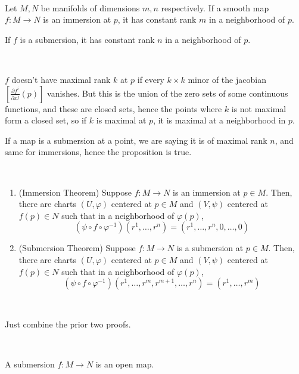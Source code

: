 \documentclass{article}
\begin{document}
\begin{proposition}
  \

  Let $M, N$ be manifolds of dimensions $m, n$ respectively. If a smooth map $f: M \to N$ is an immersion at $p$, it has constant rank $m$ in a neighborhood of $p$.

  If $f$ is a submersion, it has constant rank $n$ in a neighborhood of $p$.
\end{proposition}

\begin{customproof}
  \

  $f$ doesn't have maximal rank $k$ at $p$ if every $k \times k$ minor of the jacobian $[\frac{\partial f^i}{\partial x^j}(p)]$ vanishes. But this is the union of the zero sets of some continuous functions, and these are closed sets, hence the points where $k$ is not maximal form a closed set, so if $k$ is maximal at $p$, it is maximal at a neighborhood in $p$.

  If a map is a submersion at a point, we are saying it is of maximal rank $n$, and same for immersions, hence the proposition is true.
\end{customproof}

\begin{theorem}
  \

  \begin{enumerate}
    \item (Immersion Theorem) Suppose $f: M \to N$ is an immersion at $p \in M$. Then, there are charts $(U, \varphi)$ centered at $p \in M$ and $(V,\psi)$ centered at $f(p) \in N$ such that in a neighborhood of $\varphi(p)$, $$(\psi \circ f \circ \varphi ^{-1})(r^1, \dots, r^n) = (r^1, \dots, r^n, 0, \dots, 0)$$
    \item (Submersion Theorem) Suppose $f: M \to N$ is a submersion at $p \in M$. Then, there are charts $(U, \varphi)$ centered at $p \in M$ and $(V,\psi)$ centered at $f(p) \in N$ such that in a neighborhood of $\varphi(p)$, $$(\psi \circ f \circ \varphi ^{-1})(r^1, \dots, r^m, r^{m+1}, \dots, r^n) = (r^1, \dots, r^m)$$
  \end{enumerate}
\end{theorem}

\begin{customproof}
  \

  Just combine the prior two proofs.
\end{customproof}

\begin{corollary}
  \

  A submersion $f: M \to N$ is an open map.
\end{corollary}
\end{document}
